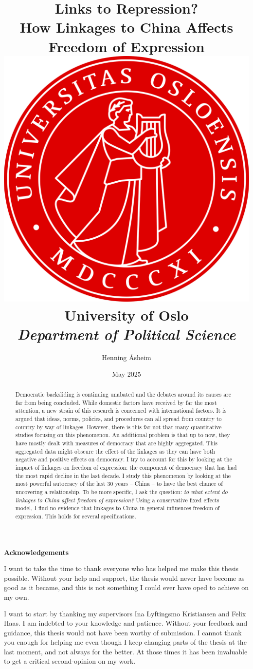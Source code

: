 \documentclass[12pt]{report} %
\title{
    {\textbf{Links to Repression?}}\\
    {\Large How Linkages to China Affects Freedom of Expression} \\
    \vspace{10mm}
    {\includegraphics[width = .6\textwidth]{graphics/uio_segl_roedt_liten_kant.png}} \\
    \vspace{10mm}
    {\large University of Oslo} \\
    {\small\textit{Department of Political Science}} \\
}
\author{Henning Åsheim}
\date{May 2025}
\begin{document}
\maketitle


\begin{abstract}
    Democratic backsliding is continuing unabated and the debates around its causes are far from being concluded. While domestic factors have received by far the most attention, a new strain of this research is concerned with international factors. It is argued that ideas, norms, policies, and procedures can all spread from country to country by way of linkages. However, there is this far not that many quantitative studies focusing on this phenomenon. An additional problem is that up to now, they have mostly dealt with measures of democracy that are highly aggregated. This aggregated data might obscure the effect of the linkages as they can have both negative and positive effects on democracy. I try to account for this by looking at the impact of linkages on freedom of expression: the component of democracy that has had the most rapid decline in the last decade. I study this phenomenon by looking at the most powerful autocracy of the last 30 years -- China -- to have the best chance of uncovering a relationship. To be more specific, I ask the question: \textit{to what extent do linkages to China affect freedom of expression?} Using a conservative fixed effects model, I find no evidence that linkages to China in general influences freedom of expression. This holds for several specifications.
\end{abstract}

\newpage

\begin{center}
    \large
    \textbf{Acknowledgements}
\end{center}
I want to take the time to thank everyone who has helped me make this thesis possible. Without your help and support, the thesis would never have become as good as it became, and this is not something I could ever have oped to achieve on my own.

I want to start by thanking my supervisors Ina Lyftingsmo Kristiansen and Felix Haas. I am indebted to your knowledge and patience. Without your feedback and guidance, this thesis would not have been worthy of submission. I cannot thank you enough for helping me even though I keep changing parts of the thesis at the last moment, and not always for the better. At those times it has been invaluable to get a critical second-opinion on my work.
\end{document}
